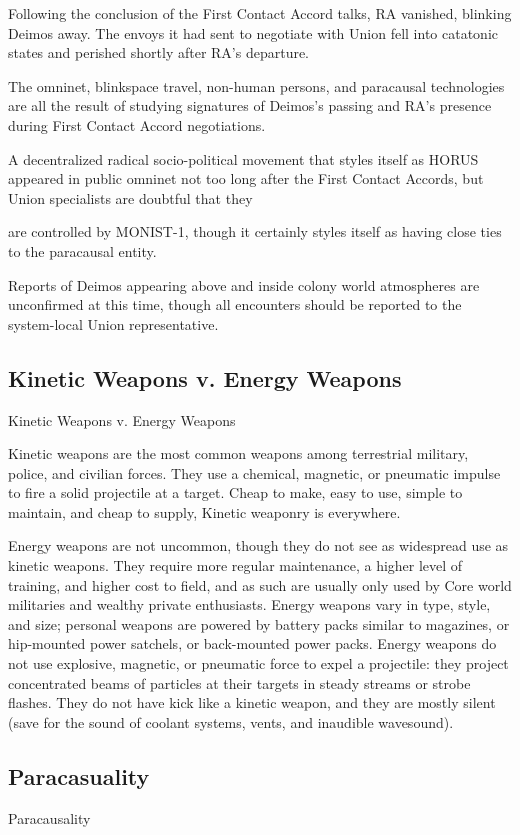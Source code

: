 Following the conclusion of the First Contact Accord talks, RA vanished, blinking Deimos away.
The envoys it had sent to negotiate with Union fell into catatonic states and perished shortly after
RA’s departure.


The omninet, blinkspace travel, non-human persons, and paracausal technologies are all the
result of studying signatures of Deimos’s passing and RA’s presence during First Contact Accord
negotiations.


A decentralized radical socio-political movement that styles itself as HORUS appeared in public
omninet not too long after the First Contact Accords, but Union specialists are doubtful that they




are controlled by MONIST-1, though it certainly styles itself as having close ties to the paracausal
entity.


Reports of Deimos appearing above and inside colony world atmospheres are unconfirmed at
this time, though all encounters should be reported to the system-local Union representative.

\subsection{Kinetic Weapons v. Energy Weapons}
Kinetic Weapons v. Energy Weapons

Kinetic weapons are the most common weapons among terrestrial military, police, and civilian
forces. They use a chemical, magnetic, or pneumatic impulse to fire a solid projectile at a target.
Cheap to make, easy to use, simple to maintain, and cheap to supply, Kinetic weaponry is
everywhere.


Energy weapons are not uncommon, though they do not see as widespread use as kinetic
weapons. They require more regular maintenance, a higher level of training, and higher cost to
field, and as such are usually only used by Core world militaries and wealthy private enthusiasts.
Energy weapons vary in type, style, and size; personal weapons are powered by battery packs
similar to magazines, or hip-mounted power satchels, or back-mounted power packs. Energy
weapons do not use explosive, magnetic, or pneumatic force to expel a projectile: they project
concentrated beams of particles at their targets in steady streams or strobe flashes. They do not
have kick like a kinetic weapon, and they are mostly silent (save for the sound of coolant
systems, vents, and inaudible wavesound).

\subsection{Paracasuality}
Paracausality

